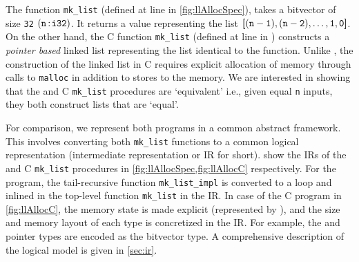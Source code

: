 The \SpecL{} function {\tt mk\_list} (defined at line  in \cref{fig:llAllocSpec}), takes
a bitvector of size {\tt 32} $({\tt n}{{\,\tt :\!i32}})$.
It returns a  value representing the list ${\tt \bm{[} (n-1),(n-2),\dots,1,0 \bm{]}}$.
On the other hand, the C function {\tt mk\_list} (defined at line  in )
constructs a {\em pointer based} linked list representing the list identical to the \SpecL{} function.
Unlike \SpecL{}, the construction of the linked list in C requires explicit allocation of memory through calls to {\tt malloc}
in addition to stores to the memory.
We are interested in showing that the \SpecL{} and C {\tt mk\_list} procedures are `equivalent'
i.e., given equal {\tt n} inputs, they both construct lists that are `equal'.



For comparison, we represent both programs in a common abstract framework.
This involves converting both {\tt mk\_list} functions to a common logical representation
(intermediate representation or IR for short).
 show the IRs of the \SpecL{} and C {\tt mk\_list}
procedures in \cref{fig:llAllocSpec,fig:llAllocC} respectively.
For the \SpecL{} program, the tail-recursive function {\tt mk\_list\_impl} is converted to a loop
and inlined in the top-level function {\tt mk\_list} in the IR.
In case of the C program in \cref{fig:llAllocC}, the memory state is made explicit (represented by \mem{}),
and the size and memory layout of each type is concretized in the IR.
For example, the  and pointer types are encoded as the  bitvector type.
A comprehensive description of the logical model is given in \cref{sec:ir}. 

